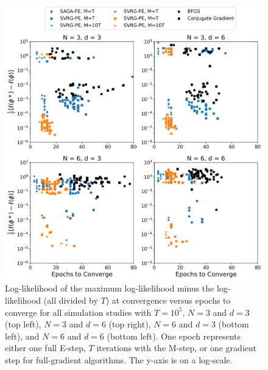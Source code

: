\begin{figure}
    \centering
    \includegraphics[width=6.5in]{../plt/scatter_sim_T_100000.png}
    \caption{Log-likelihood of the maximum log-likelihood minus the log-likelihood (all divided by $T$) at convergence versus epochs to converge for all simulation studies with $T=10^{5}$, $N=3$ and $d=3$ (top left), $N=3$ and $d=6$ (top right), $N=6$ and $d=3$ (bottom left), and $N=6$ and $d=6$ (bottom left). One epoch represents either one full E-step, $T$ iterations with the M-step, or one gradient step for full-gradient algorithms. The y-axis is on a log-scale.}
    \label{fig:scatter_sim}
\end{figure}
%




